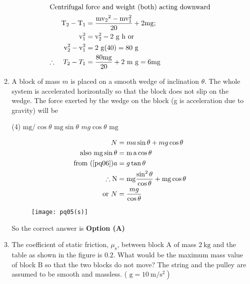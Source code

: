 \begin{enumerate}[label=\color{ocre}\textbf{\arabic*.}]
\begin{answer}
\begin{align*}
		\intertext{Centrifugal force and weight (both) acting downward}
		\mathrm{T}_{2}-\mathrm{T}_{1}&=\frac{\mathrm{m} \mathrm{v}_{2}{ }^{2}-\mathrm{m} \mathrm{v}_{1}^{2}}{20}+2 \mathrm{mg} ; \\ \mathrm{v}_{1}^{2}&=\mathrm{v}_{2}^{2}-2 \mathrm{~g} \mathrm{~h}\text{ or}\\
		\mathrm{v}_{2}^{2}-\mathrm{v}_{1}^{2}&=2 \mathrm{~g}(40)=80 \mathrm{~g}\\
		\therefore \quad T_{2}-T_{1}&=\frac{80 \mathrm{mg}}{20}+2 \mathrm{~m} \mathrm{~g}=6 \mathrm{mg}
		\end{align*}
	\end{answer}
	\item 
	A block of mass $m$ is placed on a smooth wedge of inclination $\theta$. The whole system is accelerated horizontally so that the block does not slip on the wedge. The force exerted by the wedge on the block (g is acceleration due to gravity) will be
	\begin{tasks}(4)
		\task[\textbf{A.}]	$\mathrm{mg} / \cos \theta$
		\task[\textbf{B.}] $\mathrm{mg} \sin \theta$
		\task[\textbf{C.}] $m g \cos \theta$
		\task[\textbf{D.}] $\mathrm{mg}$
	\end{tasks}
	\begin{answer}
		\begin{align}
		N&=m a \sin \theta+m g \cos \theta\\
		\text{also }\mathrm{m} \mathrm{g} \sin \theta&=\mathrm{m} \operatorname{a} \cos \theta\label{pq06}\\
		\text{from }(\ref{pq06}) a&=g \tan \theta\notag\\
		\therefore \mathrm{N}&=\mathrm{mg} \frac{\sin ^{2} \theta}{\cos \theta}+\mathrm{mg} \cos \theta\notag\\
		\text{or }N&=\frac{m g}{\cos \theta}\notag
		\end{align}
		\begin{figure}[H]
			\centering
			\texttt{[image: pq05(s)]}
		\end{figure}
		So the correct answer is \textbf{Option (A)}
	\end{answer}
	\item The coefficient of static friction, $\mu_{\mathrm{s}}$, between block $\mathrm{A}$ of mass $2 \mathrm{~kg}$ and the table as shown in the figure is $0.2$. What would be the maximum mass value of block $\mathrm{B}$ so that the two blocks do not move? The string and the pulley are assumed to be smooth and massless. ( $\left.\mathrm{g}=10 \mathrm{~m} / \mathrm{s}^{2}\right)$

\end{enumerate}

